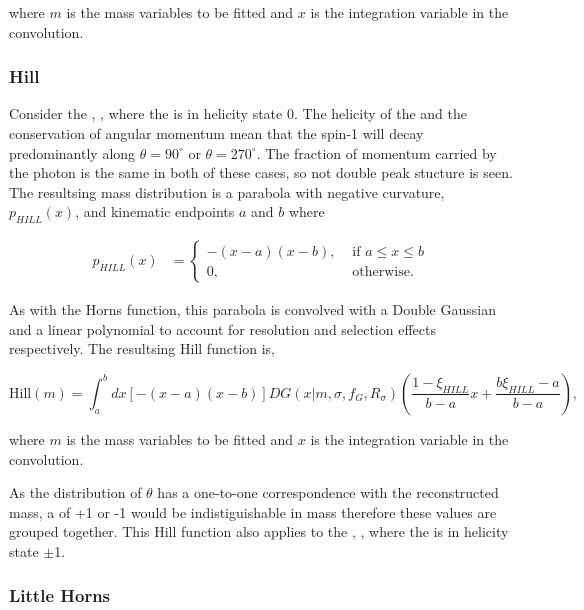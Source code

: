 where $m$ is the mass variables to be fitted and $x$ is the integration variable in the convolution.

\subsubsection{Hill}

Consider the \decay{\Bm}{\Dstarz\Kstarm}, \decay{\Dstarz}{\Dz\gamma}, where the \Dstarz is in helicity state 0. The helicity of the \Dstarz and the conservation of angular momentum mean that the spin-1 \Pgamma will decay predominantly along $\theta = 90^{\circ}$ or $\theta = 270^{\circ}$. The fraction of momentum carried by the photon is the same in both of these cases, so not double peak stucture is seen. The resultsing \B mass distribution is a parabola with negative curvature, $p_{HILL}(x)$, and kinematic endpoints $a$ and $b$ where

\begin{align}
p_{HILL}(x) &= \begin{cases}
-(x - a)(x - b), & \text{ if $a \leq x \leq b$}\\ 	
0, & \text{ otherwise.}
\end{cases} 
\end{align}

As with the Horns function, this parabola is convolved with a Double Gaussian and a linear polynomial to account for resolution and selection effects respectively. The resultsing Hill function is,

\begin{equation}
\text{Hill}(m) = \int_a^b dx \left[-(x - a)(x - b)\right] DG(x|m,\sigma,f_G,R_{\sigma}) \left( \frac{1 - \xi_{HILL}}{b - a}x + \frac{b\xi_{HILL} - a}{b - a}\right),
\end{equation}

where $m$ is the mass variables to be fitted and $x$ is the integration variable in the convolution.

As the distribution of $\theta$ has a one-to-one correspondence with the reconstructed \B mass, a \Dstar of +1 or -1 would be indistiguishable in \B mass therefore these values are grouped together. This Hill function also applies to the \decay{\Bm}{\Dstarz\Kstarm}, \decay{\Dstarz}{\Dz\piz}, where the \Dstarz is in helicity state $\pm$1.

\subsubsection{Little Horns}

